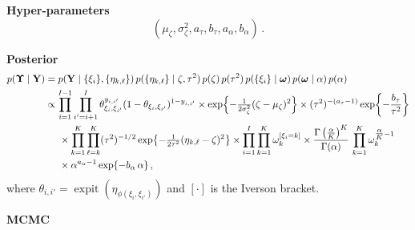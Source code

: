 \documentclass[letterpaper,12pt,openany]{article}
\def\exp#1{{\rm exp}{#1}}
\def\frac#1#2{{{#1}\over{#2}}}
\DeclareMathOperator*{\expit}{expit}
\newcommand{\ex}[1]{\exp{ \left\{ #1 \right\}}}
\def\Y{\mathbf{Y}}\def\y{\mathbf{y}}\def\Yv{\boldsymbol{Y}}\def\yv{\boldsymbol{y}}
\def\al{\alpha}\def\alv{\boldsymbol{\alpha}}
\def\sig{\sigma}\def\sigv{\boldsymbol{\sigma}}
\def\ome{\omega}
\begin{document}
\textbf{Hyper-parameters}
$$(\mu_\zeta,\sigma^2_\zeta,a_\tau,b_\tau,a_\al,b_\al)\,.$$

\textbf{Posterior}
\begin{align*}
p(\UPS\mid\Y) &= p(\Y\mid\{\xi_i\},\{\eta_{k,\ell}\})\,p(\{\eta_{k,\ell}\}\mid\zeta,\tau^2)\,p(\zeta)\,p(\tau^2)\,p(\{\xi_i \}\mid\omev)\,p(\omev\mid\alpha)\,p(\alpha)\\
&\propto\prod_{i=1}^{I-1}\prod_{i'=i+1}^I \theta_{\xi_i,\xi_{i'}}^{y_{i,i'}}(1-\theta_{\xi_i,\xi_{i'}})^{1-y_{i,i'}}
\times \ex{-\tfrac{1}{2\sig_\zeta^2}(\zeta-\mu_\zeta)^2} \times (\tau^2)^{-(a_\tau-1)}\,\ex{-\frac{b_\tau}{\tau^2}} \\
&\hspace{0.5cm} \times \prod_{k=1}^K\prod_{\ell=k}^K (\tau^2)^{-1/2}\,\ex{-\tfrac{1}{2\tau^2}(\eta_{k,\ell} - \zeta)^2} \times \prod_{i=1}^I\prod_{k=1}^K\omega_k^{[\xi_i=k]} \times \frac{\Gamma\left(\tfrac{\al}{K}\right)^K}{\Gamma(\alpha)}\,\prod_{k=1}^K \ome_k^{\tfrac{\al}{K}-1}\\
 &\hspace{0.5cm}\times \alpha^{a_\al-1}\,\ex{-b_\al\,\al}\,,
\end{align*}
where $\theta_{i,i'}=\expit(\eta_{\phi(\xi_i,\xi_{i'})})$ and $[\cdot]$ is the Iverson bracket.


\textbf{MCMC}
\end{document}

